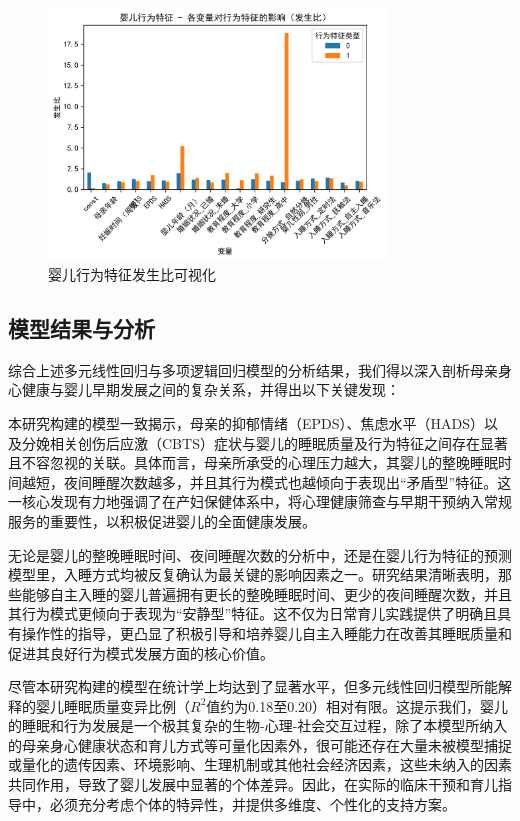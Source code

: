 \documentclass[withoutpreface,bwprint]{cumcmthesis}
\begin{document}
\begin{figure}[htbp]
    \centering
    \includegraphics[width=0.8\textwidth]{figures/婴儿行为特征_odds_ratios.png} %
    \caption{婴儿行为特征发生比可视化}
    \label{fig:baby_behavior_odds_ratios}
\end{figure}

\subsection{模型结果与分析}
综合上述多元线性回归与多项逻辑回归模型的分析结果，我们得以深入剖析母亲身心健康与婴儿早期发展之间的复杂关系，并得出以下关键发现：

本研究构建的模型一致揭示，母亲的抑郁情绪（EPDS）、焦虑水平（HADS）以及分娩相关创伤后应激（CBTS）症状与婴儿的睡眠质量及行为特征之间存在显著且不容忽视的关联。具体而言，母亲所承受的心理压力越大，其婴儿的整晚睡眠时间越短，夜间睡醒次数越多，并且其行为模式也越倾向于表现出“矛盾型”特征。这一核心发现有力地强调了在产妇保健体系中，将心理健康筛查与早期干预纳入常规服务的重要性，以积极促进婴儿的全面健康发展。

无论是婴儿的整晚睡眠时间、夜间睡醒次数的分析中，还是在婴儿行为特征的预测模型里，入睡方式均被反复确认为最关键的影响因素之一。研究结果清晰表明，那些能够自主入睡的婴儿普遍拥有更长的整晚睡眠时间、更少的夜间睡醒次数，并且其行为模式更倾向于表现为“安静型”特征。这不仅为日常育儿实践提供了明确且具有操作性的指导，更凸显了积极引导和培养婴儿自主入睡能力在改善其睡眠质量和促进其良好行为模式发展方面的核心价值。

尽管本研究构建的模型在统计学上均达到了显著水平，但多元线性回归模型所能解释的婴儿睡眠质量变异比例（$R^2$值约为0.18至0.20）相对有限。这提示我们，婴儿的睡眠和行为发展是一个极其复杂的生物-心理-社会交互过程，除了本模型所纳入的母亲身心健康状态和育儿方式等可量化因素外，很可能还存在大量未被模型捕捉或量化的遗传因素、环境影响、生理机制或其他社会经济因素，这些未纳入的因素共同作用，导致了婴儿发展中显著的个体差异。因此，在实际的临床干预和育儿指导中，必须充分考虑个体的特异性，并提供多维度、个性化的支持方案。
\end{document}
